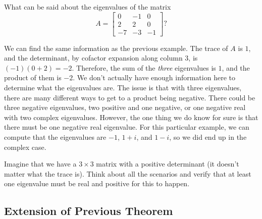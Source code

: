 \begin{example}
What can be said about the eigenvalues of the matrix
\begin{equation*}
A = \begin{bmatrix}
0 & -1 &  0 \\
2 & 2 &  0 \\
-7 &-3 & -1
\end{bmatrix}?
\end{equation*}
\end{example}

\begin{exampleSol}
We can find the same information as the previous example. The trace of $A$ is $1$, and the determinant, by cofactor expansion along column 3, is $(-1)(0 + 2) = -2$. Therefore, the sum of the \emph{three} eigenvalues is $1$, and the product of them is $-2$. We don't actually have enough information here to determine what the eigenvalues are. The issue is that with three eigenvalues, there are many different ways to get to a product being negative. There could be three negative eigenvalues, two positive and one negative, or one negative real with two complex eigenvalues. However, the one thing we do know for sure is that there must be one negative real eigenvalue. For this particular example, we can compute that the eigenvalues are $-1$, $1+i$, and $1-i$, so we did end up in the complex case. 
\end{exampleSol}

\begin{exercise}
Imagine that we have a $3 \times 3$ matrix with a positive determinant (it doesn't matter what the trace is). Think about all the scenarios and verify that at least one eigenvalue must be real and positive for this to happen. 
\end{exercise}


\subsection{Extension of Previous Theorem}

